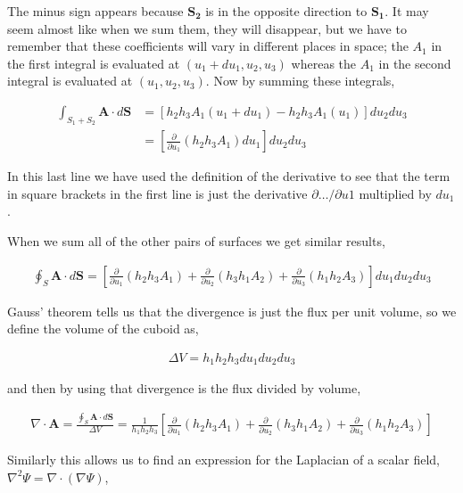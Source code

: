 \documentclass[11pt]{amsart}
\begin{document}
The minus sign appears because $\mathbf{S_2}$ is in the opposite direction to $\mathbf{S_1}$. It may seem almost like when we sum them, they will disappear, but we have to remember that these coefficients will vary in different places in space; the $A_1$ in the first integral is evaluated at $(u_1 + du_1, u_2, u_3)$ whereas the $A_1$ in the second integral is evaluated at $(u_1, u_2, u_3)$. Now by summing these integrals,

\begin{align*}
  \int_{S_1 + S_2} \mathbf{A}\cdot d\mathbf{S} &= \left[h_2 h_3 A_1(u_1 + du_1) - h_2 h_3 A_1(u_1)\right] du_2 du_3 \\
                                               &= \left[\frac{\partial}{\partial u_1} (h_2 h_3 A_1) du_1\right] du_2 du_3
\end{align*}

In this last line we have used the definition of the derivative to see that the term in square brackets in the first line is just the derivative $\partial \dots / \partial u1$ multiplied by $du_1$.

When we sum all of the other pairs of surfaces we get similar results,

\begin{align*}
  \oint_S \mathbf{A}\cdot d\mathbf{S} = \left[\frac{\partial}{\partial u_1}(h_2h_3A_1) + \frac{\partial}{\partial u_2}(h_3h_1A_2) + \frac{\partial}{\partial u_3}(h_1h_2A_3)\right] du_1 du_2 du_3
\end{align*}

Gauss' theorem tells us that the divergence is just the flux per unit volume, so we define the volume of the cuboid as,

\begin{align*}
  \Delta V = h_1h_2h_3du_1du_2du_3
\end{align*}

and then by using that divergence is the flux divided by volume,

\begin{align*}
  \nabla\cdot\mathbf{A} = \frac{\oint_S \mathbf{A}\cdot d\mathbf{S}}{\Delta V} = \frac{1}{h_1h_2h_3} \left[\frac{\partial}{\partial u_1}(h_2h_3A_1) + \frac{\partial}{\partial u_2}(h_3h_1A_2) + \frac{\partial}{\partial u_3}(h_1h_2A_3)\right]
\end{align*}

Similarly this allows us to find an expression for the Laplacian of a scalar field, $\nabla^2 \Psi = \nabla \cdot (\nabla \Psi)$,
\end{document}
